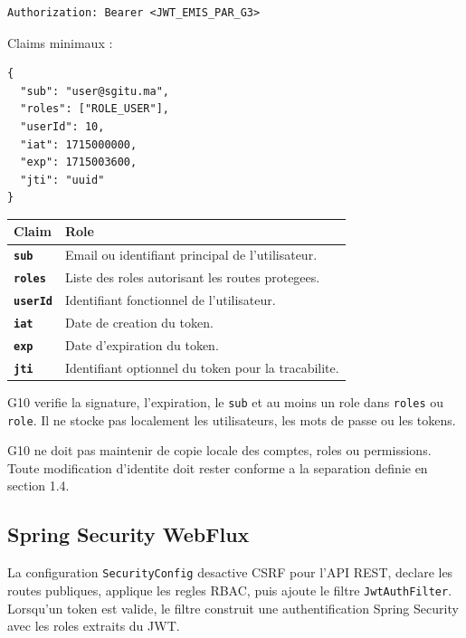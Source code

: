 \documentclass[12pt, a4paper]{article}
\begin{document}
\begin{lstlisting}[style=codeStyle]
Authorization: Bearer <JWT_EMIS_PAR_G3>
\end{lstlisting}

Claims minimaux :

\begin{lstlisting}[style=codeStyle]
{
  "sub": "user@sgitu.ma",
  "roles": ["ROLE_USER"],
  "userId": 10,
  "iat": 1715000000,
  "exp": 1715003600,
  "jti": "uuid"
}
\end{lstlisting}

\begin{center}
\begin{tabular}{>{\bfseries}p{3cm} p{8.5cm}}
\rowcolor{navyblue}
\color{white}\textbf{Claim} & \color{white}\textbf{Role} \\
\hline
\texttt{sub} & Email ou identifiant principal de l'utilisateur. \\
\rowcolor{lightgray}
\texttt{roles} & Liste des roles autorisant les routes protegees. \\
\texttt{userId} & Identifiant fonctionnel de l'utilisateur. \\
\rowcolor{lightgray}
\texttt{iat} & Date de creation du token. \\
\texttt{exp} & Date d'expiration du token. \\
\rowcolor{lightgray}
\texttt{jti} & Identifiant optionnel du token pour la tracabilite. \\
\end{tabular}
\end{center}

G10 verifie la signature, l'expiration, le \texttt{sub} et au moins un role dans \texttt{roles} ou \texttt{role}. Il ne stocke pas localement les utilisateurs, les mots de passe ou les tokens.

\begin{calloutdanger}
G10 ne doit pas maintenir de copie locale des comptes, roles ou permissions. Toute modification d'identite doit rester conforme a la separation definie en section 1.4.
\end{calloutdanger}

\subsection{Spring Security WebFlux}

La configuration \texttt{SecurityConfig} desactive CSRF pour l'API REST, declare les routes publiques, applique les regles RBAC, puis ajoute le filtre \texttt{JwtAuthFilter}. Lorsqu'un token est valide, le filtre construit une authentification Spring Security avec les roles extraits du JWT.
\end{document}
